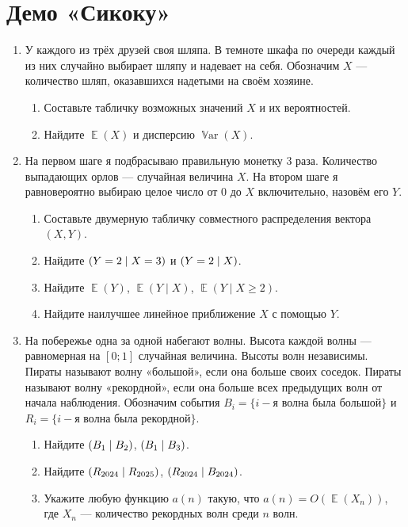 \documentclass[12pt]{article}
\DeclareMathOperator{\Var}{\mathbb{V}ar}
\let\P\relax
\DeclareMathOperator{\P}{\mathbb{P}}
\DeclareMathOperator{\E}{\mathbb{E}}
\begin{document}
\section*{Демо «Сикоку»}

\begin{enumerate}
    \item У каждого из трёх друзей своя шляпа. 
    В темноте шкафа по очереди каждый из них случайно выбирает шляпу и надевает на себя. 
    Обозначим $X$ — количество шляп, оказавшихся надетыми на своём хозяине. 

    \begin{enumerate}
        \item Составьте табличку возможных значений $X$ и их вероятностей.
        \item Найдите $\E(X)$ и дисперсию $\Var(X)$.
    \end{enumerate}
    
    
    \item На первом шаге я подбрасываю правильную монетку 3 раза. 
    Количество выпадающих орлов — случайная величина $X$. 
    На втором шаге я равновероятно выбираю целое число от $0$ до $X$ включительно,
    назовём его $Y$.
    \begin{enumerate}
        \item Составьте двумерную табличку совместного распределения вектора $(X, Y)$.
        \item Найдите $\P(Y = 2 \mid X = 3)$ и $\P(Y = 2 \mid X)$.
        \item Найдите $\E(Y)$, $\E(Y \mid X)$, $\E(Y \mid X \geq 2)$.
        \item Найдите наилучшее линейное приближение $X$ с помощью $Y$.
    \end{enumerate}
    
    \item %
    На побережье одна за одной набегают волны. 
    Высота каждой волны — равномерная на $[0; 1]$ случайная величина. 
    Высоты волн независимы. 
    Пираты называют волну «большой», если она больше своих соседок. 
    Пираты называют волну «рекордной», если она больше всех предыдущих волн от начала наблюдения. 
    Обозначим события $B_i = \{i-\text{я волна была большой}\}$ и $R_i = \{i-\text{я волна была рекордной}\}$.
    
    \begin{enumerate}
     \item Найдите $\P(B_1 \mid B_2)$, $\P(B_1 \mid B_3)$.
     \item Найдите $\P(R_{2024} \mid R_{2025})$, $\P(R_{2024} \mid B_{2024})$.
     \item Укажите любую функцию $a(n)$ такую, что $a(n) = O(\E(X_n))$, где $X_n$ — количество рекордных волн среди $n$ волн. 
    \end{enumerate}
 

\end{enumerate}
\end{document}
